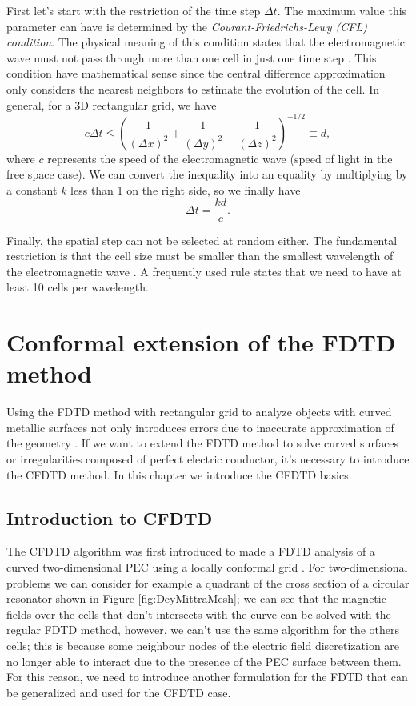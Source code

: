 \documentclass[12pt, oneside]{book}
\begin{document}
\indent First let's start with the restriction of the time step $\Delta t$. The maximum value this parameter can have is determined by the \textit{Courant-Friedrichs-Lewy (CFL) condition}. The physical meaning of this condition states that the electromagnetic wave must not pass through more than one cell in just one time step \cite{kunz1993finite}. This condition have mathematical sense since the central difference approximation only considers the nearest neighbors to estimate the evolution of the cell. In general, for a 3D rectangular grid, we have
\begin{equation}
    c \Delta t \leq \left( \dfrac{1}{(\Delta x)^2} + \dfrac{1}{(\Delta y)^2} + \dfrac{1}{(\Delta z)^2} \right)^{-1/2} \equiv d,
\end{equation}
where $c$ represents the speed of the electromagnetic wave (speed of light in the free space case). We can convert the inequality into an equality by multiplying by a constant $k$ less than 1 on the right side, so we finally have
\begin{equation}
    \Delta t = \dfrac{kd}{c}.
    \label{eq:CFL}
\end{equation}

Finally, the spatial step can not be selected at random either. The fundamental restriction is that the cell size must be smaller than the smallest wavelength of the electromagnetic wave \cite{kunz1993finite}. A frequently used rule states that we need to have at least 10 cells per wavelength.

\chapter{Conformal extension of the FDTD method}

Using the FDTD method with rectangular grid to analyze objects with curved metallic surfaces not only introduces errors due to inaccurate approximation of the geometry \cite{97384}. If we want to extend the FDTD method to solve curved surfaces or irregularities composed of perfect electric conductor, it's necessary to introduce the CFDTD method. In this chapter we introduce the CFDTD basics.

\section{Introduction to CFDTD}

The CFDTD algorithm was first introduced to made a FDTD analysis of a curved two-dimensional PEC using a locally conformal grid \cite{DeyMittra1997}. For two-dimensional problems we can consider for example a quadrant of the cross section of a circular resonator shown in Figure \ref{fig:DeyMittraMesh}; we can see that the magnetic fields over the cells that don't intersects with the curve can be solved with the regular FDTD method, however, we can't use the same algorithm for the others cells; this is because some neighbour nodes of the electric field discretization are no longer able to interact due to the presence of the PEC surface between them. For this reason, we need to introduce another formulation for the FDTD that can be generalized and used for the CFDTD case.
\end{document}
